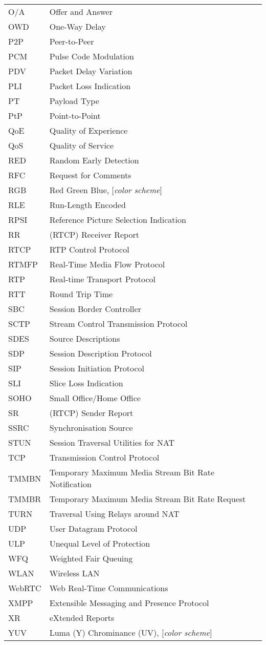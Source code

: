 \begin{longtable}{ll}
O/A  	& Offer and Answer \\
OWD 	& One-Way Delay \\
P2P 	& Peer-to-Peer \\
PCM 	& Pulse Code Modulation \\
PDV  	& Packet Delay Variation \\
PLI 	& Packet Loss Indication \\
PT  	& Payload Type \\
PtP 	& Point-to-Point \\
QoE 	& Quality of Experience \\
QoS 	& Quality of Service \\
RED 	& Random Early Detection \\
RFC 	& Request for Comments \\
RGB 	& Red Green Blue, [\textit{color scheme}] \\
RLE  	& Run-Length Encoded \\
RPSI 	& Reference Picture Selection Indication \\
RR  	& (RTCP) Receiver Report \\
RTCP 	& RTP Control Protocol \\
RTMFP	& Real-Time Media Flow Protocol \\
RTP 	& Real-time Transport Protocol \\
RTT 	& Round Trip Time \\
SBC  	& Session Border Controller \\
SCTP 	& Stream Control Transmission Protocol  \\
SDES	& Source Descriptions \\
SDP 	& Session Description Protocol \\
SIP 	& Session Initiation Protocol \\
SLI 	& Slice Loss Indication \\
SOHO 	& Small Office/Home Office \\
SR  	& (RTCP) Sender Report \\
SSRC	& Synchronisation Source \\
STUN  	& Session Traversal Utilities for NAT \\
TCP 	& Transmission Control Protocol \\
TMMBN 	& Temporary Maximum Media Stream Bit Rate Notification \\
TMMBR 	& Temporary Maximum Media Stream Bit Rate Request \\
TURN  	& Traversal Using Relays around NAT \\
UDP 	& User Datagram Protocol \\
ULP 	& Unequal Level of Protection \\
WFQ 	& Weighted Fair Queuing \\
WLAN	& Wireless LAN \\
WebRTC	& Web Real-Time Communications \\
XMPP 	& Extensible Messaging and Presence Protocol \\
XR  	& eXtended Reports \\
YUV 	& Luma (Y) Chrominance (UV), [\textit{color scheme}] \\
\end{longtable}
